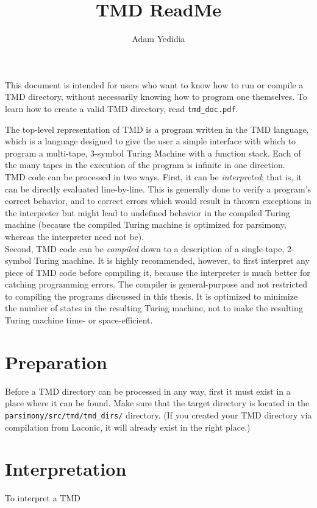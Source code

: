 \documentclass[11pt]{article}
\title{TMD ReadMe}
\author{Adam Yedidia}
\begin{document}
    
\maketitle

This document is intended for users who want to know how to run or compile a TMD directory, without necessarily knowing how to program one themselves. To learn how to create a valid TMD directory, read \texttt{tmd\_doc.pdf}.

The top-level representation of TMD is a program written in the TMD language, which is a language designed to give the user a simple interface with which to program a multi-tape, 3-symbol Turing Machine with a function stack. Each of the many tapes in the execution of the program is infinite in one direction. \\

TMD code can be processed in two ways. First, it can be \emph{interpreted}; that is, it can be directly evaluated line-by-line. This is generally done to verify a program's correct behavior, and to correct errors which would result in thrown exceptions in the interpreter but might lead to undefined behavior in the compiled Turing machine (because the compiled Turing machine is optimized for parsimony, whereas the interpreter need not be). \\

Second, TMD code can be \emph{compiled} down to a description of a single-tape, 2-symbol Turing machine. It is highly recommended, however, to first interpret any piece of TMD code before compiling it, because the interpreter is much better for catching programming errors. The compiler is general-purpose and not restricted to compiling the programs discussed in this thesis. It is optimized to minimize the number of states in the resulting Turing machine, not to make the resulting Turing machine time- or space-efficient. \\

\section{Preparation}

Before a TMD directory can be processed in any way, first it must exist in a place where it can be found. Make sure that the target directory is located in the \texttt{parsimony/src/tmd/tmd\_dirs/} directory. (If you created your TMD directory via compilation from Laconic, it will already exist in the right place.)

\section{Interpretation}

To interpret a TMD 
\end{document}
